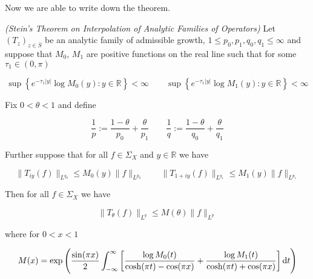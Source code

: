 \vspace{2mm}

Now we are able to write down the theorem.

\vspace{2mm}

\begin{mdframed}
	\begin{theorem}\emph{(Stein's Theorem on Interpolation of Analytic Families of Operators)}
		Let $\left( T_z \right)_{z \in \overline{S}}$ be an analytic family of admissible growth, $1 \leq p_0,p_1,q_0,q_1 \leq \infty$ and suppose that $M_0$, $M_1$ are positive functions on the real line such that for some $\tau_1 \in (0,\pi)$

			\begin{equation}
				\sup\left\{e^{-\tau_1 \vert y \vert} \log M_0(y) : y \in \mathbb{R}\right\} < \infty \qquad \sup\left\{e^{-\tau_1 \vert y \vert} \log M_1(y) : y \in \mathbb{R}\right\} < \infty
			\end{equation}

			Fix $0 < \theta < 1$ and define

			\begin{equation}
				\frac{1}{p} := \frac{1 - \theta}{p_0} + \frac{\theta}{p_1} \qquad \frac{1}{q} := \frac{1 - \theta}{q_0} + \frac{\theta}{q_1}
			\end{equation}

			Further suppose that for all $f \in \Sigma_X$ and $y \in \mathbb{R}$ we have

			\begin{equation}
				\|T_{iy}(f)\|_{L^{q_0}} \leq M_0(y)\|f\|_{L^{p_0}} \qquad \|T_{1 + iy}(f)\|_{L^{q_1}} \leq M_1(y)\|f\|_{L^{p_1}} 
			\end{equation}

			Then for all $f \in \Sigma_X$ we have

			\begin{equation*}
				\|T_\theta(f)\|_{L^q} \leq M(\theta)\|f\|_{L^p}
			\end{equation*}

			where for $0 < x < 1$

			\begin{equation*}
				M(x) = \exp\left( \frac{\sin(\pi x)}{2} \int_{-\infty}^\infty \left[ \frac{\log M_0(t)}{\cosh(\pi t) - \cos(\pi x)} + \frac{\log M_1(t)}{\cosh(\pi t) + \cos(\pi x)}\right] \mathop{}\!\mathrm{d} t \right)
			\end{equation*}
	\end{theorem}
\end{mdframed}

